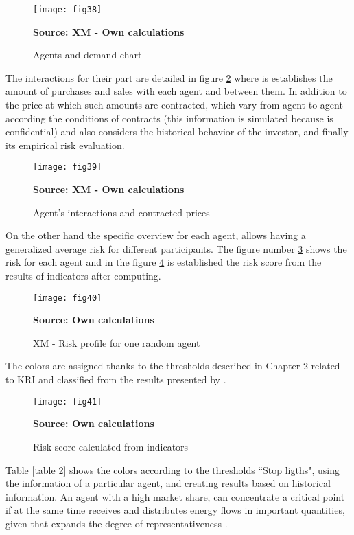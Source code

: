 \documentclass[12pt]{book}
\begin{document}
\begin{figure}  
\centering    
\texttt{[image: fig38]}  
\caption{Agents and demand chart}
\scriptsize 
\textbf{Source: XM - Own calculations}
\captionsetup{justification=centering,margin=1cm}   
\label{Fig 38}
\end{figure}

The interactions for their part are detailed in figure \ref{Fig 39}  where is establishes the amount of purchases and sales with each agent and between them. In addition to the price at which such amounts are contracted, which vary from agent to agent according the conditions of contracts (this information is simulated because is confidential) and also considers the historical behavior of the investor, and finally its empirical risk evaluation.

\begin{figure}  
\centering    
\texttt{[image: fig39]}  
\caption{Agent's interactions and contracted prices}
\scriptsize 
\textbf{Source: XM - Own calculations}
\captionsetup{justification=centering,margin=1cm}   
\label{Fig 39}
\end{figure}

On the other hand the specific overview for each agent, allows having a generalized average risk for different participants. The figure number \ref{Fig 40} shows the risk for each agent and in the figure \ref{Fig 41} is established the risk score from the results of indicators after computing. 

\begin{figure}  
\centering    
\texttt{[image: fig40]}  
\caption{XM - Risk profile for one random agent}
\scriptsize 
\textbf{Source: Own calculations}
\captionsetup{justification=centering,margin=1cm}   
\label{Fig 40}
\end{figure}

The colors are assigned thanks to the thresholds described in Chapter 2 related to KRI and classified from the results presented by \cite{kaplan1997} \cite{beasley2010} \cite{scandizzo2005}.

\begin{figure}  
\centering    
\texttt{[image: fig41]}  
\caption{Risk score calculated from indicators}
\scriptsize 
\textbf{Source: Own calculations}
\captionsetup{justification=centering,margin=1cm}   
\label{Fig 41}
\end{figure}

Table \ref{table 2} shows the colors according to the thresholds ``Stop ligths", using the information of a particular agent, and creating results based on historical information. An agent with a high market share, can concentrate a critical point if at the same time receives and distributes energy flows in important quantities, given that expands the degree of representativeness \cite{beasley2010}.
\end{document}
